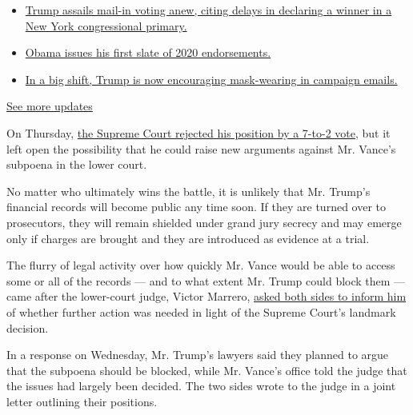 \begin{itemize}
\tightlist
\item
  \href{https://www.nytimes.com/2020/08/03/us/elections/biden-vs-trump.html?action=click\&pgtype=Article\&state=default\&region=MAIN_CONTENT_1\&context=storylines_live_updates\#link-6494b448}{Trump
  assails mail-in voting anew, citing delays in declaring a winner in a
  New York congressional primary.}
\item
  \href{https://www.nytimes.com/2020/08/03/us/elections/biden-vs-trump.html?action=click\&pgtype=Article\&state=default\&region=MAIN_CONTENT_1\&context=storylines_live_updates\#link-3de249e6}{Obama
  issues his first slate of 2020 endorsements.}
\item
  \href{https://www.nytimes.com/2020/08/03/us/elections/biden-vs-trump.html?action=click\&pgtype=Article\&state=default\&region=MAIN_CONTENT_1\&context=storylines_live_updates\#link-54e34d20}{In
  a big shift, Trump is now encouraging mask-wearing in campaign
  emails.}
\end{itemize}

\href{https://www.nytimes.com/2020/08/03/us/elections/biden-vs-trump.html?action=click\&pgtype=Article\&state=default\&region=MAIN_CONTENT_1\&context=storylines_live_updates}{See
more updates}

On Thursday,
\href{https://www.nytimes.com/2020/07/09/us/trump-taxes-supreme-court.html}{the
Supreme Court rejected his position by a 7-to-2 vote}, but it left open
the possibility that he could raise new arguments against Mr. Vance's
subpoena in the lower court.

No matter who ultimately wins the battle, it is unlikely that Mr.
Trump's financial records will become public any time soon. If they are
turned over to prosecutors, they will remain shielded under grand jury
secrecy and may emerge only if charges are brought and they are
introduced as evidence at a trial.

The flurry of legal activity over how quickly Mr. Vance would be able to
access some or all of the records --- and to what extent Mr. Trump could
block them --- came after the lower-court judge, Victor Marrero,
\href{https://www.nytimes.com/2020/07/10/nyregion/donald-trump-taxes-cy-vance.html}{asked
both sides to inform him} of whether further action was needed in light
of the Supreme Court's landmark decision.

In a response on Wednesday, Mr. Trump's lawyers said they planned to
argue that the subpoena should be blocked, while Mr. Vance's office told
the judge that the issues had largely been decided. The two sides wrote
to the judge in a joint letter outlining their positions.

